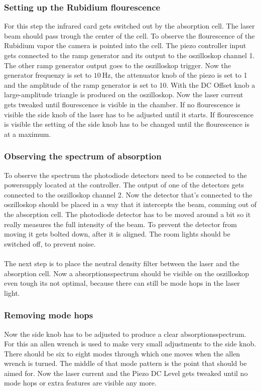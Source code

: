 \subsubsection{Setting up the Rubidium flourescence}
\label{sec:flourescence}
For this step the infrared card gets switched out by the absorption cell.
The laser beam should pass trough the center of the cell.
To observe the flourescence of the Rubidium vapor the camera is pointed into the cell.
The piezo controller input gets connected to the ramp generator and its output to the oszilloskop channel 1.
The other ramp generator output goes to the oszilloskop trigger.
Now the generator frequenzy is set to $\SI{10}{\Hz}$, the attenuator knob of the piezo is set to 1 and the amplitude of the ramp generator is set to 10.
With the DC Offset knob a large-amplitude triangle is produced on the oszilloskop.
Now the laser current gets tweaked until flourescence is visible in the chamber.
If no flourescence is visible the side knob of the laser has to be adjusted until it starts.
If flourescence is visible the setting of the side knob has to be changed until the flourescence is at a maximum.

\subsubsection{Observing the spectrum of absorption}
To observe the spectrum the photodiode detectors need to be connected to the powersupply located at the controller.
The output of one of the detectors gets connected to the oszilloskop channel 2.
Now the detector that's connected to the oszilloskop should be placed in a way that it intercepts the beam, comming out of the absorption cell.
The photodiode detector has to be moved around a bit so it really measures the full intensity of the beam.
To prevent the detector from moving it gets bolted down, after it is aligned.
The room lights should be switched off, to prevent noise.
\\\\
The next step is to place the neutral density filter between the laser and the absorption cell.
Now a absorptionsspectrum should be visible on the oszilloskop even tough its not optimal, because there can still be mode hops in the laser light.

\subsubsection{Removing mode hops}
Now the side knob has to be adjusted to produce a clear absorptionsspectrum.
For this an allen wrench is used to make very small adjustments to the side knob.
There should be six to eight modes through which one moves when the allen wrench is turned.
The middle of that mode pattern is the point that should be aimed for.
Now the laser current and the Piezo DC Level gets tweaked until no mode hops or extra features are visible any more.

